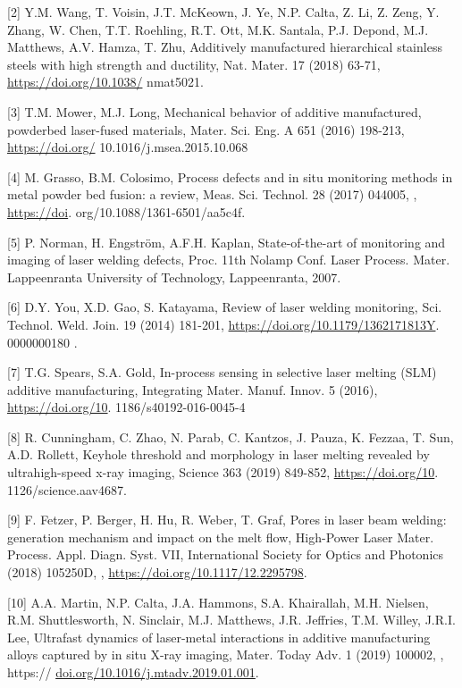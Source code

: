 \documentclass[10pt]{article}
\begin{document}
[2] Y.M. Wang, T. Voisin, J.T. McKeown, J. Ye, N.P. Calta, Z. Li, Z. Zeng, Y. Zhang, W. Chen, T.T. Roehling, R.T. Ott, M.K. Santala, P.J. Depond, M.J. Matthews, A.V. Hamza, T. Zhu, Additively manufactured hierarchical stainless steels with high strength and ductility, Nat. Mater. 17 (2018) 63-71, \href{https://doi.org/10.1038/}{https://doi.org/10.1038/} nmat5021.

[3] T.M. Mower, M.J. Long, Mechanical behavior of additive manufactured, powderbed laser-fused materials, Mater. Sci. Eng. A 651 (2016) 198-213, \href{https://doi.org/}{https://doi.org/} 10.1016/j.msea.2015.10.068

[4] M. Grasso, B.M. Colosimo, Process defects and in situ monitoring methods in metal powder bed fusion: a review, Meas. Sci. Technol. 28 (2017) 044005, , \href{https://doi}{https://doi}. org/10.1088/1361-6501/aa5c4f.

[5] P. Norman, H. Engström, A.F.H. Kaplan, State-of-the-art of monitoring and imaging of laser welding defects, Proc. 11th Nolamp Conf. Laser Process. Mater. Lappeenranta University of Technology, Lappeenranta, 2007.

[6] D.Y. You, X.D. Gao, S. Katayama, Review of laser welding monitoring, Sci. Technol. Weld. Join. 19 (2014) 181-201, \href{https://doi.org/10.1179/1362171813Y}{https://doi.org/10.1179/1362171813Y}. 0000000180 .

[7] T.G. Spears, S.A. Gold, In-process sensing in selective laser melting (SLM) additive manufacturing, Integrating Mater. Manuf. Innov. 5 (2016), \href{https://doi.org/10}{https://doi.org/10}. 1186/s40192-016-0045-4

[8] R. Cunningham, C. Zhao, N. Parab, C. Kantzos, J. Pauza, K. Fezzaa, T. Sun, A.D. Rollett, Keyhole threshold and morphology in laser melting revealed by ultrahigh-speed x-ray imaging, Science 363 (2019) 849-852, \href{https://doi.org/10}{https://doi.org/10}. 1126/science.aav4687.

[9] F. Fetzer, P. Berger, H. Hu, R. Weber, T. Graf, Pores in laser beam welding: generation mechanism and impact on the melt flow, High-Power Laser Mater. Process. Appl. Diagn. Syst. VII, International Society for Optics and Photonics (2018) 105250D, , \href{https://doi.org/10.1117/12.2295798}{https://doi.org/10.1117/12.2295798}.

[10] A.A. Martin, N.P. Calta, J.A. Hammons, S.A. Khairallah, M.H. Nielsen, R.M. Shuttlesworth, N. Sinclair, M.J. Matthews, J.R. Jeffries, T.M. Willey, J.R.I. Lee, Ultrafast dynamics of laser-metal interactions in additive manufacturing alloys captured by in situ X-ray imaging, Mater. Today Adv. 1 (2019) 100002, , https:// \href{http://doi.org/10.1016/j.mtadv.2019.01.001}{doi.org/10.1016/j.mtadv.2019.01.001}.
\end{document}
